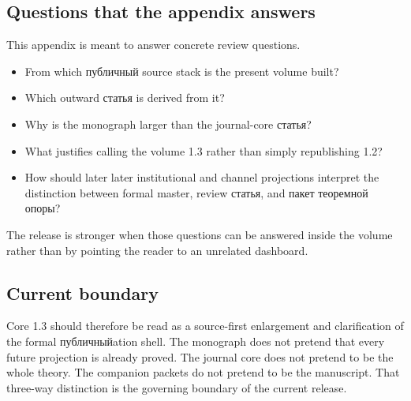 \subsection{Questions that the appendix answers}

This appendix is meant to answer concrete review questions.

\begin{itemize}
\item From which публичный source stack is the present volume built?
\item Which outward статья is derived from it?
\item Why is the monograph larger than the journal-core статья?
\item What justifies calling the volume 1.3 rather than simply republishing 1.2?
\item How should later later institutional and channel projections interpret the distinction between formal
      master, review статья, and пакет теоремной опоры?
\end{itemize}

The release is stronger when those questions can be answered inside the volume rather than by
pointing the reader to an unrelated dashboard.

\subsection{Current boundary}

Core 1.3 should therefore be read as a source-first enlargement and clarification of the formal
публичныйation shell.
The monograph does not pretend that every future projection is already proved.
The journal core does not pretend to be the whole theory.
The companion packets do not pretend to be the manuscript.
That three-way distinction is the governing boundary of the current release.

\clearpage
